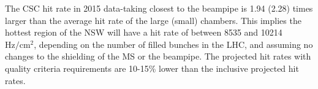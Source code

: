 The CSC hit rate in 2015 data-taking closest to the beampipe is 1.94 (2.28) times larger than the average hit rate of the large (small) chambers. This implies the hottest region of the NSW will have a hit rate of between 8535 and 10214 $\text{Hz} / \text{cm}^2$, depending on the number of filled bunches in the LHC, and assuming no changes to the shielding of the MS or the beampipe. The projected hit rates with quality criteria requirements are 10-15\% lower than the inclusive projected hit rates.

